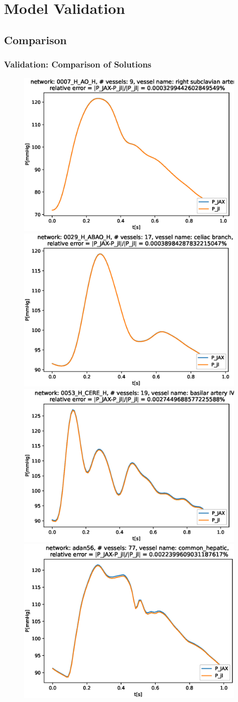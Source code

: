 \documentclass[compress]{beamer}
\begin{document}
\section{Model Validation}
\subsection{Comparison}
\begin{frame}
	\frametitle{Validation: Comparison of Solutions}
	\begin{figure} [H]
		\centering
		\includegraphics[width=0.46\columnwidth]{../figures/0007_H_AO_H_right_subclavian_artery_P.eps}
		\includegraphics[width=0.46\columnwidth]{../figures/0029_H_ABAO_H_celiac_branch_P.eps
		}
		\includegraphics[width=0.46\columnwidth]{../figures/0053_H_CERE_H_basilar_artery_IV_P.eps}
		\includegraphics[width=0.46\columnwidth]{../figures/adan56_common_hepatic_P.eps}
		\label{fig:val}
	\end{figure}
\end{frame}
\end{document}
